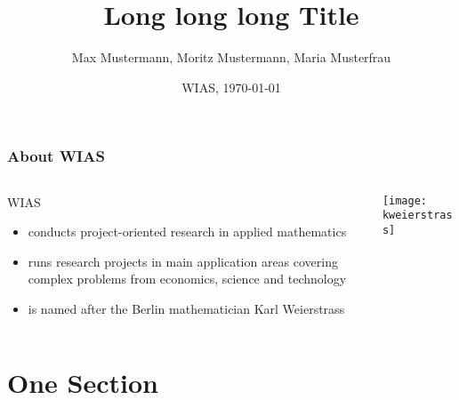 \documentclass[9pt,english]{beamer}
\title[Short Title]{Long long long Title}
\author{Max Mustermann, Moritz Mustermann, Maria Musterfrau}
\date{WIAS, \today}
\begin{document}
\maketitle   %

\begin{frame}
  \frametitle{About WIAS}
  \begin{columns}
    \begin{column}{.45\linewidth}
      \Large WIAS

      \begin{itemize}
        \item conducts project-oriented research in applied mathematics
        \item runs research projects in main application areas covering complex problems from economics, science and technology
        \item is named after the Berlin mathematician Karl Weierstrass
      \end{itemize}
    \end{column}
    \begin{column}{.45\linewidth}
      \centering
      \texttt{[image: kweierstrass]}
    \end{column}
  \end{columns}
\end{frame}

\tocatbegin
\tocatsection
\section{One Section}
\end{document}
